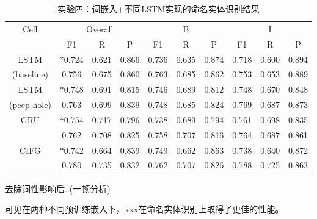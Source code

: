 \begin{table}[H]
    \centering
    \caption{实验四：词嵌入+不同LSTM实现的命名实体识别结果}
    \begin{tabular}{cccccccccc}
        \toprule
            \multirow{2}{*}{Cell} &\multicolumn{3}{c}{Overall} &\multicolumn{3}{c}{B} &\multicolumn{3}{c}{I}\\
            \cmidrule(lr){2-4} \cmidrule(lr){5-7} \cmidrule(lr){8-10}
            & F1 & R & P & F1 & R & P & F1 & R & P\\
        \midrule
            LSTM & *0.724 & 0.621 & 0.866 & 0.736 & 0.635 & 0.874 & 0.718 & 0.600 & 0.894\\
            (baseline) & 0.756 & 0.675 & 0.860 & 0.763 & 0.685 & 0.862 & 0.753 & 0.653 & 0.889\\
            LSTM & *0.748 & 0.691 & 0.815 & 0.746 & 0.689 & 0.812 & 0.748 & 0.670 & 0.848\\
            (peep-hole) & 0.763 & 0.699 & 0.839 & 0.748 & 0.685 & 0.824 & 0.769 & 0.687 & 0.873\\
            \multirow{2}{2cm}{GRU} & *0.754 & 0.717 & 0.796 & 0.738 & 0.689 & 0.794 & 0.761 & 0.698 & 0.835\\
                                 & 0.762 & 0.708 & 0.825 & 0.758 & 0.707 & 0.816 & 0.764 & 0.687 & 0.861\\
            \multirow{2}{2cm}{CIFG} & *0.742 & 0.664 & 0.839 & 0.749 & 0.662 & 0.863 & 0.738 & 0.640 & 0.872\\
                                  & 0.780 & 0.735 & 0.832 & 0.762 & 0.707 & 0.826 & 0.788 & 0.725 & 0.863\\
        \bottomrule
    \end{tabular}
    \label{tab:tab1}
\end{table}
去除词性影响后..(一顿分析)

可见在两种不同预训练嵌入下，xxx在命名实体识别上取得了更佳的性能。

